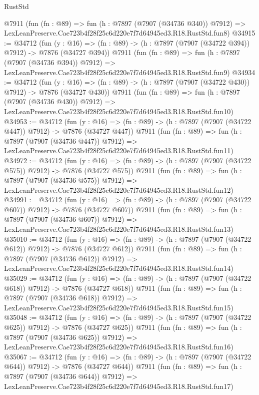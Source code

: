 \begin{lexlean}{RustStd}
\begin{coremodule}
    @7911
    (fun (fn : @89) =>
    fun (h : @7897 (@7907 (@34736 @340)) @7912) =>
    LexLeanPreserve.Cae723b4f28f25c6d220e7f7d64945ed3.R18.RustStd.fun8)
@34915 := @34712
    (fun (y : @16) => (fn : @89) -> (h : @7897 (@7907 (@34722 @394)) @7912) -> @7876 (@34727 @394))
    @7911
    (fun (fn : @89) =>
    fun (h : @7897 (@7907 (@34736 @394)) @7912) =>
    LexLeanPreserve.Cae723b4f28f25c6d220e7f7d64945ed3.R18.RustStd.fun9)
@34934 := @34712
    (fun (y : @16) => (fn : @89) -> (h : @7897 (@7907 (@34722 @430)) @7912) -> @7876 (@34727 @430))
    @7911
    (fun (fn : @89) =>
    fun (h : @7897 (@7907 (@34736 @430)) @7912) =>
    LexLeanPreserve.Cae723b4f28f25c6d220e7f7d64945ed3.R18.RustStd.fun10)
@34953 := @34712
    (fun (y : @16) => (fn : @89) -> (h : @7897 (@7907 (@34722 @447)) @7912) -> @7876 (@34727 @447))
    @7911
    (fun (fn : @89) =>
    fun (h : @7897 (@7907 (@34736 @447)) @7912) =>
    LexLeanPreserve.Cae723b4f28f25c6d220e7f7d64945ed3.R18.RustStd.fun11)
@34972 := @34712
    (fun (y : @16) => (fn : @89) -> (h : @7897 (@7907 (@34722 @575)) @7912) -> @7876 (@34727 @575))
    @7911
    (fun (fn : @89) =>
    fun (h : @7897 (@7907 (@34736 @575)) @7912) =>
    LexLeanPreserve.Cae723b4f28f25c6d220e7f7d64945ed3.R18.RustStd.fun12)
@34991 := @34712
    (fun (y : @16) => (fn : @89) -> (h : @7897 (@7907 (@34722 @607)) @7912) -> @7876 (@34727 @607))
    @7911
    (fun (fn : @89) =>
    fun (h : @7897 (@7907 (@34736 @607)) @7912) =>
    LexLeanPreserve.Cae723b4f28f25c6d220e7f7d64945ed3.R18.RustStd.fun13)
@35010 := @34712
    (fun (y : @16) => (fn : @89) -> (h : @7897 (@7907 (@34722 @612)) @7912) -> @7876 (@34727 @612))
    @7911
    (fun (fn : @89) =>
    fun (h : @7897 (@7907 (@34736 @612)) @7912) =>
    LexLeanPreserve.Cae723b4f28f25c6d220e7f7d64945ed3.R18.RustStd.fun14)
@35029 := @34712
    (fun (y : @16) => (fn : @89) -> (h : @7897 (@7907 (@34722 @618)) @7912) -> @7876 (@34727 @618))
    @7911
    (fun (fn : @89) =>
    fun (h : @7897 (@7907 (@34736 @618)) @7912) =>
    LexLeanPreserve.Cae723b4f28f25c6d220e7f7d64945ed3.R18.RustStd.fun15)
@35048 := @34712
    (fun (y : @16) => (fn : @89) -> (h : @7897 (@7907 (@34722 @625)) @7912) -> @7876 (@34727 @625))
    @7911
    (fun (fn : @89) =>
    fun (h : @7897 (@7907 (@34736 @625)) @7912) =>
    LexLeanPreserve.Cae723b4f28f25c6d220e7f7d64945ed3.R18.RustStd.fun16)
@35067 := @34712
    (fun (y : @16) => (fn : @89) -> (h : @7897 (@7907 (@34722 @644)) @7912) -> @7876 (@34727 @644))
    @7911
    (fun (fn : @89) =>
    fun (h : @7897 (@7907 (@34736 @644)) @7912) =>
    LexLeanPreserve.Cae723b4f28f25c6d220e7f7d64945ed3.R18.RustStd.fun17)

\end{coremodule}
\end{lexlean}
